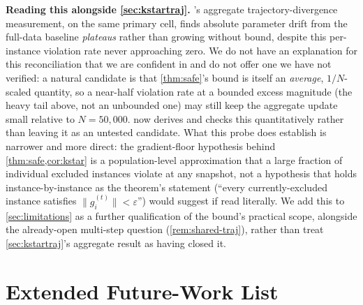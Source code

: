 \documentclass{article}
\theoremstyle{plain}
\theoremstyle{definition}
\theoremstyle{remark}
\begin{document}
\textbf{Reading this alongside \cref{sec:kstartraj}.} 's aggregate trajectory-divergence measurement, on the same primary cell, finds absolute parameter drift from the full-data baseline \emph{plateaus} rather than growing without bound, despite this per-instance violation rate never approaching zero. We do not have an explanation for this reconciliation that we are confident in and do not offer one we have not verified: a natural candidate is that \cref{thm:safe}'s bound is itself an \emph{average}, $1/N$-scaled quantity, so a near-half violation rate at a bounded excess magnitude (the heavy tail above, not an unbounded one) may still keep the aggregate update small relative to $N=50{,}000$.  now derives and checks this quantitatively rather than leaving it as an untested candidate. What this probe does establish is narrower and more direct: the gradient-floor hypothesis behind \cref{thm:safe,cor:kstar} is a population-level approximation that a large fraction of individual excluded instances violate at any snapshot, not a hypothesis that holds instance-by-instance as the theorem's statement (``every currently-excluded instance satisfies $\|g_i^{(t)}\|<\varepsilon$'') would suggest if read literally. We add this to \cref{sec:limitations} as a further qualification of the bound's practical scope, alongside the already-open multi-step question (\cref{rem:shared-traj}), rather than treat \cref{sec:kstartraj}'s aggregate result as having closed it.

\section{Extended Future-Work List}
\label{app:limitations-extended}
\end{document}

